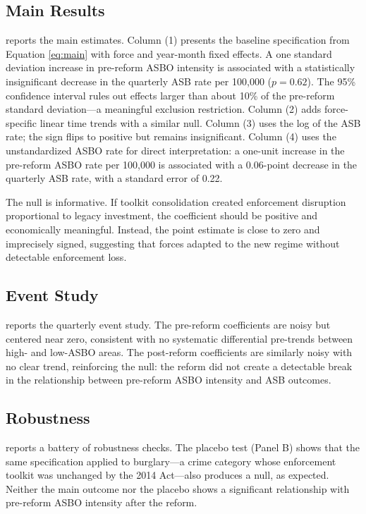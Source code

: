 \documentclass[12pt]{article}
\begin{document}
\subsection{Main Results}

 reports the main estimates. Column (1) presents the baseline specification from Equation \ref{eq:main} with force and year-month fixed effects. A one standard deviation increase in pre-reform ASBO intensity is associated with a statistically insignificant decrease in the quarterly ASB rate per 100,000 ($p = 0.62$). The 95\% confidence interval rules out effects larger than about 10\% of the pre-reform standard deviation---a meaningful exclusion restriction. Column (2) adds force-specific linear time trends with a similar null. Column (3) uses the log of the ASB rate; the sign flips to positive but remains insignificant. Column (4) uses the unstandardized ASBO rate for direct interpretation: a one-unit increase in the pre-reform ASBO rate per 100,000 is associated with a 0.06-point decrease in the quarterly ASB rate, with a standard error of 0.22.



The null is informative. If toolkit consolidation created enforcement disruption proportional to legacy investment, the coefficient should be positive and economically meaningful. Instead, the point estimate is close to zero and imprecisely signed, suggesting that forces adapted to the new regime without detectable enforcement loss.

\subsection{Event Study}

 reports the quarterly event study. The pre-reform coefficients are noisy but centered near zero, consistent with no systematic differential pre-trends between high- and low-ASBO areas. The post-reform coefficients are similarly noisy with no clear trend, reinforcing the null: the reform did not create a detectable break in the relationship between pre-reform ASBO intensity and ASB outcomes.



\subsection{Robustness}

 reports a battery of robustness checks. The placebo test (Panel B) shows that the same specification applied to burglary---a crime category whose enforcement toolkit was unchanged by the 2014 Act---also produces a null, as expected. Neither the main outcome nor the placebo shows a significant relationship with pre-reform ASBO intensity after the reform.
\end{document}
